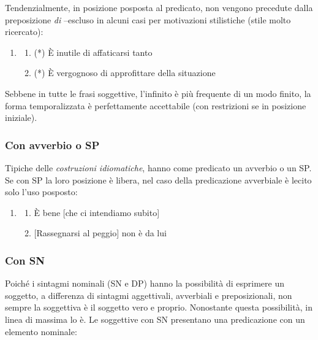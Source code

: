 \documentclass[
  a4paper,
  twoside,
  11pt,
  chapterprefix=false,
  bibliography=totocnumbered,
  listof=flat]{scrbook}
\providecommand{\tightlist}{%
  \setlength{\itemsep}{0pt}\setlength{\parskip}{0pt}}
\begin{document}
Tendenzialmente, in posizione posposta al predicato, non vengono precedute dalla preposizione \emph{di} --escluso in alcuni casi per motivazioni stilistiche (stile molto ricercato):

\begin{enumerate}
\def\labelenumi{(\arabic{enumi})}
\setcounter{enumi}{30}
\item
  \begin{enumerate}
  \def\labelenumii{\alph{enumii}.}
  \tightlist
  \item
    (*) È inutile di affaticarsi tanto
  \item
    (*) È vergognoso di approfittare della situazione
  \end{enumerate}
\end{enumerate}

Sebbene in tutte le frasi soggettive, l'infinito è più frequente di un modo finito, la forma temporalizzata è perfettamente accettabile (con restrizioni se in posizione iniziale).

\hypertarget{con-avverbio-o-sp}{%
\subsubsection{Con avverbio o SP}\label{con-avverbio-o-sp}}

Tipiche delle \emph{costruzioni idiomatiche}, hanno come predicato un avverbio o un SP. Se con SP la loro posizione è libera, nel caso della predicazione avverbiale è lecito solo l'uso posposto:

\begin{enumerate}
\def\labelenumi{(\arabic{enumi})}
\setcounter{enumi}{31}
\item
  \begin{enumerate}
  \def\labelenumii{\alph{enumii}.}
  \tightlist
  \item
    È bene {[}che ci intendiamo subito{]}
  \item
    {[}Rassegnarsi al peggio{]} non è da lui
  \end{enumerate}
\end{enumerate}

\hypertarget{con-sn}{%
\subsubsection{Con SN}\label{con-sn}}

Poiché i sintagmi nominali (SN e DP) hanno la possibilità di esprimere un soggetto, a differenza di sintagmi aggettivali, avverbiali e preposizionali, non sempre la soggettiva è il soggetto vero e proprio. Nonostante questa possibilità, in linea di massima lo è. Le soggettive con SN presentano una predicazione con un elemento nominale:
\end{document}
